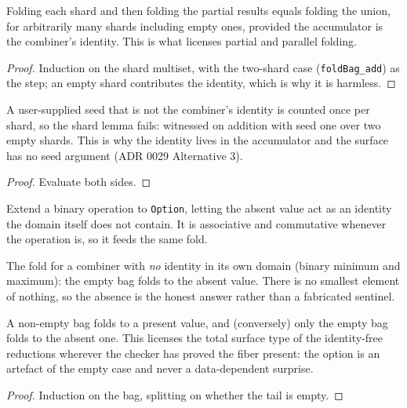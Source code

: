\begin{theorem}
  \label{thm:foldbag-shards}\leanok
  Folding each shard and then folding the partial results equals folding
  the union, for arbitrarily many shards including empty ones, provided
  the accumulator is the combiner's identity.  This is what licenses
  partial and parallel folding.
\end{theorem}
\begin{proof}\leanok
  Induction on the shard multiset, with the two-shard case
  (\texttt{foldBag\_add}) as the step; an empty shard contributes the
  identity, which is why it is harmless.
\end{proof}

\begin{theorem}
  \label{thm:foldbag-seed-counterexample}
  \leanok
  A user-supplied seed that is not the combiner's identity is counted once
  per shard, so the shard lemma fails: witnessed on addition with seed one
  over two empty shards.  This is why the identity lives in the
  accumulator and the surface has no seed argument (ADR 0029
  Alternative 3).
\end{theorem}
\begin{proof}\leanok
  Evaluate both sides.
\end{proof}

\begin{definition}
  \label{def:optionlift}\leanok
  Extend a binary operation to \texttt{Option}, letting the absent value
  act as an identity the domain itself does not contain.  It is
  associative and commutative whenever the operation is, so it feeds the
  same fold.
\end{definition}

\begin{definition}
  \label{def:foldbag-opt}\leanok
  The fold for a combiner with \emph{no} identity in its own domain
  (binary minimum and maximum): the empty bag folds to the absent value.
  There is no smallest element of nothing, so the absence is the honest
  answer rather than a fabricated sentinel.
\end{definition}

\begin{theorem}
  \label{thm:foldbag-opt-issome}\leanok
  A non-empty bag folds to a present value, and (conversely) only the
  empty bag folds to the absent one.  This licenses the total surface type
  of the identity-free reductions wherever the checker has proved the
  fiber present: the option is an artefact of the empty case and never a
  data-dependent surprise.
\end{theorem}
\begin{proof}\leanok
  Induction on the bag, splitting on whether the tail is empty.
\end{proof}

